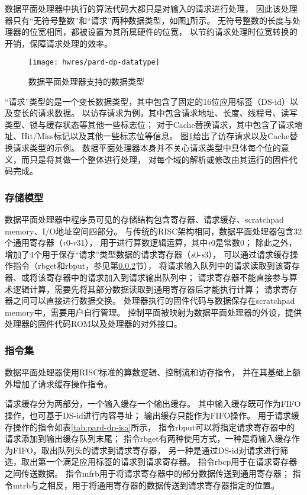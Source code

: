 数据平面处理器中执行的算法代码大都只是对输入的请求进行处理，
因此该处理器只有``无符号整数''和``请求''两种数据类型，如图\ref{fig:pard-dp-datatype}所示。
无符号整数的长度与处理器的位宽相同，都被设置为其所属硬件的位宽，
以节约请求处理时位宽转换的开销，保障请求处理的效率。

\begin{figure}[H]
  \centering
  \texttt{[image: hwres/pard-dp-datatype]}
  \caption{数据平面处理器支持的数据类型}
  \label{fig:pard-dp-datatype}
\end{figure}
 
``请求''类型的是一个变长数据类型，其中包含了固定的16位应用标签（DS-id）以及变长的请求数据。
以访存请求为例，其中包含请求地址、长度、线程号、读写类型、锁与缓存状态等其他一些标志位；
对于Cache替换请求，其中包含了请求地址、Hit/Miss标记以及其他一些标志位等信息。
图\ref{fig:pard-dp-datatype}给出了访存请求以及Cache替换请求类型的示例。
数据平面处理器本身并不关心请求类型中具体每个位的意义，而只是将其做一个整体进行处理，
对每个域的解析或修改由其运行的固件代码完成。

\subsubsection{存储模型}
数据平面处理器中程序员可见的存储结构包含寄存器、请求缓存、scratchpad memory、I/O地址空间四部分。
与传统的RISC架构相同，数据平面处理器包含32个通用寄存器（\textit{r}0-\textit{r}31），
用于进行算数逻辑运算，其中\textit{r}0是常数0；
除此之外，增加了4个用于保存``请求''类型数据的请求寄存器（\textit{s}0-\textit{s}3），
可以通过请求缓存操作指令（rbget和rbput，参见第\ref{chap:hwresman:dp:isa}节），
将请求输入队列中的请求读取到该寄存器、或将该寄存器中的请求加入到请求输出队列中；
请求寄存器不能直接参与算术逻辑计算，需要先将其部分数据读取到通用寄存器后才能执行计算；
请求寄存器之间可以直接进行数据交换。
处理器执行的固件代码与数据保存在scratchpad memory中，需要用户自行管理。
控制平面被映射为数据平面处理器的外设，提供处理器的固件代码ROM以及处理器的对外接口。

\subsubsection{指令集}
\label{chap:hwresman:dp:isa}

数据平面处理器使用RISC标准的算数逻辑、控制流和访存指令，
并在其基础上额外增加了请求缓存操作指令。

请求缓存分为两部分，一个输入缓存一个输出缓存。
其中输入缓存既可作为FIFO操作，也可基于DS-id进行内容寻址；
输出缓存只能作为FIFO操作。
用于请求缓存操作的指令如表\ref{tab:pard-dp-isa}所示，
指令rbput可以将指定请求寄存器中的请求添加到输出缓存队列末尾；
指令rbget有两种使用方式，一种是将输入缓存作为FIFO，取出队列头的请求到请求寄存器，
另一种是通过DS-id对请求进行筛选，取出第一个满足应用标签的请求到请求寄存器。
指令rbcp用于在请求寄存器之间传送数据。
指令mfrb用于将请求寄存器中的部分数据传送到通用寄存器；
指令mtrb与之相反，用于将通用寄存器的数据传送到请求寄存器指定的位置。

